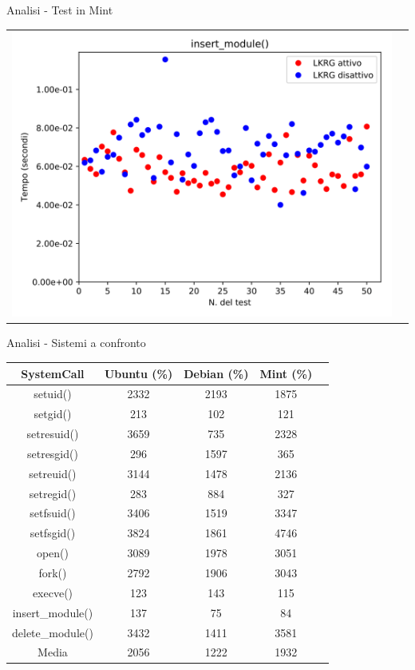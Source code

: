 \documentclass[12pt]{beamer}
\begin{document}
\begin{frame}[fragile]{Analisi - Test in Mint}
\begin{tabular}{ c c }
    	\includegraphics[scale=0.11]{res/Mint/Insert}\\
    \end{tabular}
  \end{frame}
  \endgroup
  \begin{frame}[fragile]{Analisi - Sistemi a confronto}
  	\begin{center}
  		\footnotesize
    	\begin{tabular}{|c|c|c|c|c|}
			\hline
			\textbf{SystemCall} & \bm{$\Delta$}\textbf{ Ubuntu (\%)} & \bm{$\Delta$}\textbf{ Debian (\%)} & \bm{$\Delta$}\textbf{Mint (\%)} \\
			\hline
			setuid() & 2332 & 2193 & 1875 \\
			\hline
			setgid() & 213 & 102 & 121 \\
			\hline
			setresuid() & 3659 & 735 & 2328 \\
			\hline
			setresgid() & 296 & 1597 & 365 \\
			\hline
			setreuid() & 3144 & 1478 & 2136 \\
			\hline
			setregid() & 283 & 884 & 327 \\
			\hline
			setfsuid() & 3406 & 1519 & 3347 \\
			\hline
			setfsgid() & 3824 & 1861 & 4746 \\
			\hline
			open() & 3089 & 1978 & 3051 \\
			\hline
			fork() & 2792 & 1906 & 3043 \\
			\hline
			execve() & 123 & 143 & 115 \\
			\hline
			insert\_module() & 137 & 75 & 84 \\
			\hline
			delete\_module() & 3432 & 1411 & 3581 \\
			\hline
			\hline
			Media & 2056 & 1222 & 1932 \\
			\hline
		\end{tabular}
    \end{center}
  \end{frame}
\end{document}
